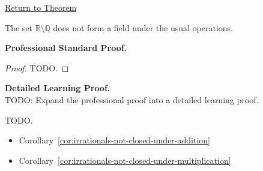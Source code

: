 \newpage
{}
\label{prf:irrationals-are-not-a-field}

\begin{remark*}[Return]
\hyperref[cor:irrationals-are-not-a-field]{Return to Theorem}
\end{remark*}

\begin{theorem*}
The set $\mathbb{R}\setminus\mathbb{Q}$ does not form a field under the usual
operations.
\end{theorem*}

\textbf{Professional Standard Proof.}~\\
\begin{proof}
TODO.
\end{proof}

\textbf{Detailed Learning Proof.}~\\
TODO: Expand the professional proof into a detailed learning proof.


\begin{remark*}
TODO.
\end{remark*}

\begin{dependencies}
\begin{itemize}
  \item Corollary~\ref*{cor:irrationals-not-closed-under-addition}
  \item Corollary~\ref*{cor:irrationals-not-closed-under-multiplication}
\end{itemize}
\end{dependencies}

